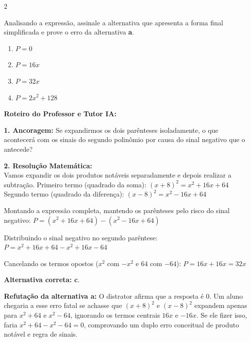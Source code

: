 \begin{multicols*}{2}
\begin{enunciadoLiteral}
Analisando a expressão, assinale a alternativa que apresenta a forma final simplificada e prove o erro da alternativa \textbf{a}.

\begin{enumerate}[label=\alph*), itemsep=\espacoAlt]
    \item $ P = 0 $
    \item $ P = 16x $
    \item $ P = 32x $
    \item $ P = 2x^2 + 128 $
\end{enumerate}
\end{enunciadoLiteral}

\ifgabarito
    \begin{tcolorbox}[colback=CorTitUm!5, colframe=CorTitUm, boxrule=1pt, arc=4pt, left=6pt, right=6pt, top=6pt, bottom=6pt]
    \small\textbf{\textcolor{CorTitUm}{Roteiro do Professor e Tutor IA:}}\par\vspace{0.1cm}
    \color{CinzaEscuro}
    \textbf{1. Ancoragem:} Se expandirmos os dois parênteses isoladamente, o que acontecerá com os sinais do segundo polinômio por causa do sinal negativo que o antecede?\par\vspace{0.1cm}
    \textbf{2. Resolução Matemática:}\\
    Vamos expandir os dois produtos notáveis separadamente e depois realizar a subtração.
    Primeiro termo (quadrado da soma): $ (x + 8)^2 = x^2 + 16x + 64 $
    Segundo termo (quadrado da diferença): $ (x - 8)^2 = x^2 - 16x + 64 $
    
    Montando a expressão completa, mantendo os parênteses pelo risco do sinal negativo:
    $ P = (x^2 + 16x + 64) - (x^2 - 16x + 64) $
    
    Distribuindo o sinal negativo no segundo parêntese:
    $ P = x^2 + 16x + 64 - x^2 + 16x - 64 $
    
    Cancelando os termos opostos ($x^2$ com $-x^2$ e $64$ com $-64$):
    $ P = 16x + 16x = 32x $
    
    \textbf{Alternativa correta: c}.
    
    \textbf{Refutação da alternativa a:} O distrator afirma que a resposta é 0. Um aluno chegaria a esse erro fatal se achasse que $ (x + 8)^2 $ e $ (x - 8)^2 $ expandem apenas para $ x^2 + 64 $ e $ x^2 - 64 $, ignorando os termos centrais $16x$ e $-16x$. Se ele fizer isso, faria $ x^2 + 64 - x^2 - 64 = 0 $, comprovando um duplo erro conceitual de produto notável e regra de sinais.
    \end{tcolorbox}
    \vspace{0.15cm}
    

\end{multicols*}
